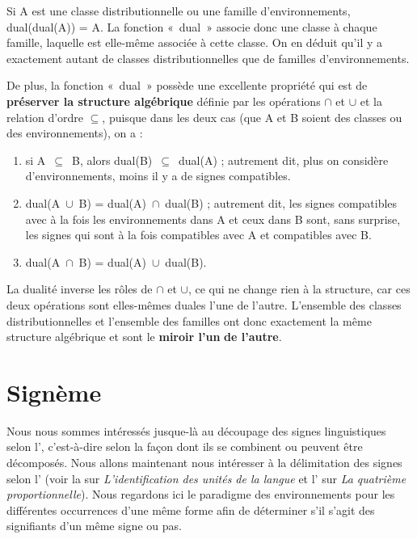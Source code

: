 {    Si A est une classe distributionnelle ou une famille d’environnements, dual(dual(A)) = A. La fonction «~dual~» associe donc une classe à chaque famille, laquelle est elle-même associée à cette classe. On en déduit qu’il y a exactement autant de classes distributionnelles que de familles d’environnements.

    De plus, la fonction «~dual~» possède une excellente propriété qui est de \textbf{préserver la structure algébrique} définie par les opérations \textrm{${\cap}$} et \textrm{${\cup}$} et la relation d’ordre \textrm{${\subseteq}$}, puisque dans les deux cas (que A et B soient des classes ou des environnements), on a :

    \begin{enumerate}
    \item  si A~\textrm{${\subseteq}$}~B, alors dual(B)~\textrm{${\subseteq}$}~dual(A) ; autrement dit, plus on considère d’environnements, moins il y a de signes compatibles.
    \item  dual(A~\textrm{${\cup}$}~B) = dual(A)~\textrm{${\cap}$}~dual(B) ; autrement dit, les signes compatibles avec à la fois les environnements dans A et ceux dans B sont, sans surprise, les signes qui sont à la fois compatibles avec A et compatibles avec B.
    \item dual(A~\textrm{${\cap}$}~B) = dual(A)~\textrm{${\cup}$}~dual(B).
    \end{enumerate}

    La dualité inverse les rôles de \textrm{${\cap}$} et \textrm{${\cup}$}, ce qui ne change rien à la structure, car ces deux opérations sont elles-mêmes duales l’une de l’autre. L’ensemble des classes distributionnelles et l’ensemble des familles ont donc exactement la même structure algébrique et sont le \textbf{miroir l’un} \textbf{de l’autre}.
}
\section{Signème}\label{sec:2.2.9}

Nous nous sommes intéressés jusque-là au découpage des signes linguistiques selon l’, c’est-à-dire selon la façon dont ils se combinent ou peuvent être décomposés. Nous allons maintenant nous intéresser à la délimitation des signes selon l’ (voir la  sur \textit{L’identification des unités de la langue} et l’ sur \textit{La quatrième proportionnelle}). Nous regardons ici le paradigme des environnements pour les différentes occurrences d’une même forme afin de déterminer s’il s’agit des signifiants d’un même signe ou pas.

